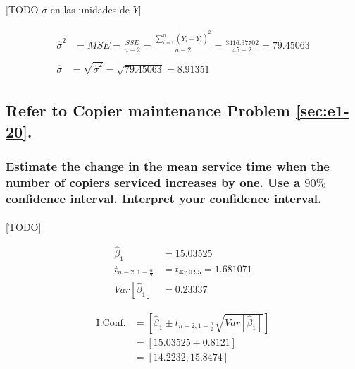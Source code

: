\documentclass{article}
\begin{document}
        \paragraph{}
        [TODO $\sigma$ en las unidades de $Y$]

        \begin{align}
          \begin{split}
            \widehat{\sigma}^2 &= MSE = \frac{SSE}{n-2} = \frac{\sum_{i=1}^n(Y_i - \widehat{Y}_i)^2}{n-2} = \frac{3416.37702}{45-2} = 79.45063
          \end{split} \\
          \begin{split}
            \widehat{\sigma} &= \sqrt{\widehat{\sigma}^2} = \sqrt{79.45063} = 8.91351
          \end{split}
        \end{align}

    \setcounter{section}{2}
    \setcounter{subsection}{4}
    \subsection{Refer to \textbf{Copier maintenance} Problem \ref{sec:e1-20}.}

      \subsubsection{Estimate the change in the mean service time when the number of copiers serviced increases by one. Use a $90\%$ confidence interval. Interpret your confidence interval.}
      \label{sec:copiers-2.5a}

        \paragraph{}
        [TODO]

        \begin{align}
          \widehat{\beta}_1 &= 15.03525 \\
          t_{n-2;1-\frac{\alpha}{2}} &= t_{43;0.95} = 1.681071\\
          Var\left[\widehat{\beta}_1\right] &= 0.23337
        \end{align}

        \begin{equation}
          \begin{split}
            \text{I.Conf.} &= \left[\widehat{\beta}_1 \pm t_{n-2;1-\frac{\alpha}{2}}\sqrt{Var\left[\widehat{\beta}_1\right]}\right]\\
            &= \left[15.03525 \pm 0.8121\right] \\
            &= \left[14.2232, 15.8474\right]
          \end{split}
        \end{equation}
\end{document}
